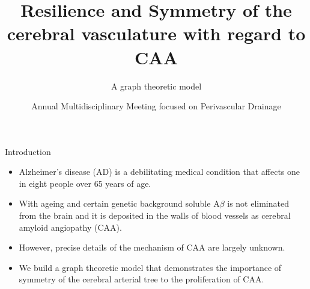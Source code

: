 \documentclass{beamer}
\title[Symmetry and CAA] %
{Resilience and Symmetry of the cerebral vasculature with regard to CAA}
\subtitle{A graph theoretic model}
\date[23rd September 2013] %
{Annual Multidisciplinary Meeting focused on Perivascular Drainage}
\begin{document}
\frame{\titlepage}


\begin{frame}{Introduction}
\begin{itemize}
\item[]Alzheimer's disease (AD) is a debilitating medical condition that affects one in eight people over 65 years of age.%
\item[]With ageing and certain genetic background soluble A$\beta$ is not eliminated from the brain and it is deposited in the walls of blood vessels as cerebral amyloid angiopathy (CAA).
\item[]However, precise details of the mechanism of CAA are largely unknown.
\item[]We build a graph theoretic model that demonstrates the importance of symmetry of the cerebral arterial tree to the proliferation of CAA.
\end{itemize}
\end{frame}
\end{document}
